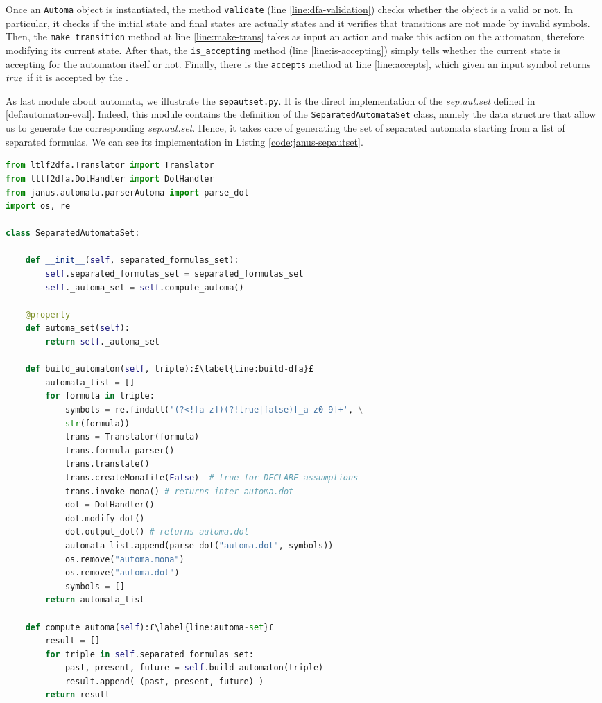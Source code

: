 Once an \texttt{Automa} object is instantiated, the method \texttt{validate} (line \ref{line:dfa-validation}) checks whether the object is a valid \DFA or not. In particular, it checks if the initial state and final states are actually states and it verifies that transitions are not made by invalid symbols.
Then, the \texttt{make\_transition} method at line \ref{line:make-trans} takes as input an action and make this action on the automaton, therefore modifying its current state. After that, the \texttt{is\_accepting} method (line \ref{line:is-accepting}) simply tells whether the current state is accepting for the automaton itself or not. Finally, there is the \texttt{accepts} method at line \ref{line:accepts}, which given an input symbol returns $\mathit{true}$ if it is accepted by the \DFA.

As last module about automata, we illustrate the \texttt{sepautset.py}. It is the direct implementation of the \textit{sep.aut.set} defined in \ref{def:automaton-eval}. Indeed, this module contains the definition of the \texttt{SeparatedAutomataSet} class, namely the data structure that allow us to generate the corresponding \textit{sep.aut.set}. Hence, it takes care of generating the set of separated automata starting from a list of separated formulas. We can see its implementation in Listing \ref{code:janus-sepautset}.
\begin{lstlisting}[language=Python, style=Python, escapechar = £, label={code:janus-sepautset}, caption={The \texttt{sepautset.py} module}]
from ltlf2dfa.Translator import Translator
from ltlf2dfa.DotHandler import DotHandler
from janus.automata.parserAutoma import parse_dot
import os, re

class SeparatedAutomataSet:

    def __init__(self, separated_formulas_set):
        self.separated_formulas_set = separated_formulas_set
        self._automa_set = self.compute_automa()

    @property
    def automa_set(self):
        return self._automa_set

    def build_automaton(self, triple):£\label{line:build-dfa}£
        automata_list = []
        for formula in triple:
            symbols = re.findall('(?<![a-z])(?!true|false)[_a-z0-9]+', \
            str(formula))
            trans = Translator(formula)
            trans.formula_parser()
            trans.translate()
            trans.createMonafile(False)  # true for DECLARE assumptions
            trans.invoke_mona() # returns inter-automa.dot
            dot = DotHandler()
            dot.modify_dot()
            dot.output_dot() # returns automa.dot
            automata_list.append(parse_dot("automa.dot", symbols))
            os.remove("automa.mona")
            os.remove("automa.dot")
            symbols = []
        return automata_list
        
    def compute_automa(self):£\label{line:automa-set}£
        result = []
        for triple in self.separated_formulas_set:
            past, present, future = self.build_automaton(triple)
            result.append( (past, present, future) )
        return result
\end{lstlisting}
